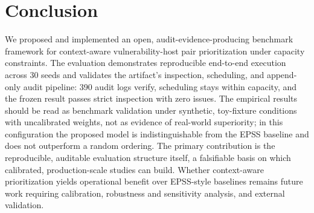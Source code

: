 \section{Conclusion}

We proposed and implemented an open, audit-evidence-producing benchmark framework
for context-aware vulnerability-host pair prioritization under capacity
constraints. The evaluation demonstrates reproducible end-to-end execution across
30 seeds and validates the artifact's inspection, scheduling, and append-only audit
pipeline: 390 audit logs verify, scheduling stays within capacity, and the frozen
result passes strict inspection with zero issues. The empirical results should be
read as benchmark validation under synthetic, toy-fixture conditions with
uncalibrated weights, not as evidence of real-world superiority; in this
configuration the proposed model is indistinguishable from the EPSS baseline and
does not outperform a random ordering. The primary contribution is the reproducible,
auditable evaluation structure itself, a falsifiable basis on which calibrated,
production-scale studies can build. Whether context-aware prioritization yields
operational benefit over EPSS-style baselines remains future work requiring
calibration, robustness and sensitivity analysis, and external validation.
